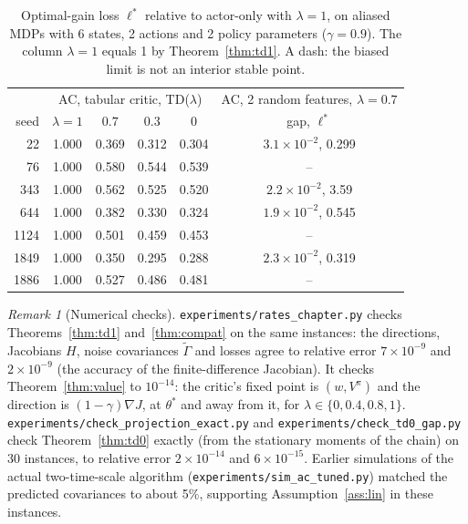 \documentclass[11pt]{article}
\theoremstyle{definition}
\theoremstyle{remark}
\newtheorem{remark}[theorem]{Remark}
\begin{document}
\begin{table}[h]
\centering
\begin{tabular}{r cccc c}
\toprule
& \multicolumn{4}{c}{AC, tabular critic, TD($\lambda$)} & AC, 2 random features, $\lambda = 0.7$ \\
seed & $\lambda = 1$ & $0.7$ & $0.3$ & $0$ & gap, $\ell^*$ \\
\midrule
22 & 1.000 & 0.369 & 0.312 & 0.304 & $3.1\times10^{-2}$, 0.299 \\
76 & 1.000 & 0.580 & 0.544 & 0.539 & -- \\
343 & 1.000 & 0.562 & 0.525 & 0.520 & $2.2\times10^{-2}$, 3.59 \\
644 & 1.000 & 0.382 & 0.330 & 0.324 & $1.9\times10^{-2}$, 0.545 \\
1124 & 1.000 & 0.501 & 0.459 & 0.453 & -- \\
1849 & 1.000 & 0.350 & 0.295 & 0.288 & $2.3\times10^{-2}$, 0.319 \\
1886 & 1.000 & 0.527 & 0.486 & 0.481 & -- \\
\bottomrule
\end{tabular}
\caption{Optimal-gain loss $\ell^*$ relative to actor-only with $\lambda = 1$, on aliased MDPs with 6 states,
2 actions and 2 policy parameters ($\gamma = 0.9$). The column $\lambda = 1$ equals 1 by
Theorem~\ref{thm:td1}. A dash: the biased limit is not an interior stable point.}
\label{tab:loss}
\end{table}

\begin{remark}[Numerical checks]
\texttt{experiments/rates\_chapter.py} checks Theorems~\ref{thm:td1} and~\ref{thm:compat} on the same
instances: the directions, Jacobians $H$, noise covariances $\tilde\Gamma$ and losses agree to relative
error $7\times10^{-9}$ and $2\times10^{-9}$ (the accuracy of the finite-difference Jacobian). It checks
Theorem~\ref{thm:value} to $10^{-14}$: the critic's fixed point is $(w, V^\pi)$ and the direction is
$(1-\gamma)\nabla J$, at $\theta^*$ and away from it, for $\lambda \in \{0, 0.4, 0.8, 1\}$.
\texttt{experiments/check\_projection\_exact.py} and \texttt{experiments/check\_td0\_gap.py} check
Theorem~\ref{thm:td0} exactly (from the stationary moments of the chain) on 30 instances, to relative
error $2\times10^{-14}$ and $6\times10^{-15}$. Earlier
simulations of the actual two-time-scale algorithm (\texttt{experiments/sim\_ac\_tuned.py}) matched
the predicted covariances to about 5\%, supporting Assumption~\ref{ass:lin} in these instances.
\end{remark}
\end{document}
